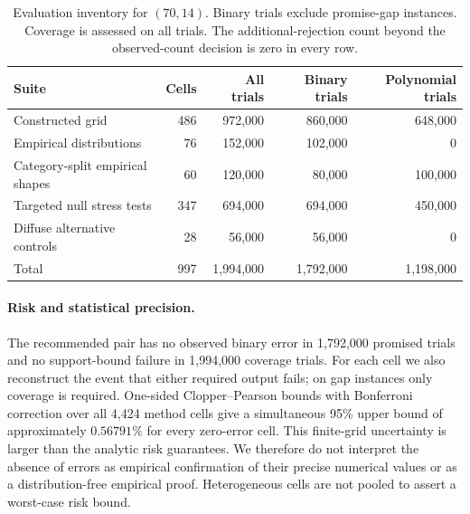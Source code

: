 \begin{table}[htbp]\centering\small
\caption{Evaluation inventory for $(70,14)$. Binary trials exclude promise-gap
instances. Coverage is assessed on all trials. The additional-rejection
count beyond the observed-count decision is zero in every row.}
\label{tab:finite-inventory}
\begin{tabular}{lrrrr}
\toprule
Suite & Cells & All trials & Binary trials & Polynomial trials\\\midrule
Constructed grid &486&972,000&860,000&648,000\\
Empirical distributions &76&152,000&102,000&0\\
Category-split empirical shapes &60&120,000&80,000&100,000\\
Targeted null stress tests &347&694,000&694,000&450,000\\
Diffuse alternative controls &28&56,000&56,000&0\\\midrule
Total &997&1,994,000&1,792,000&1,198,000\\\bottomrule
\end{tabular}
\end{table}

\paragraph{Risk and statistical precision.}
The recommended pair has no observed binary error in 1,792,000 promised
trials and no support-bound failure in 1,994,000 coverage trials.
For each cell we also reconstruct the event that either required output
fails; on gap instances only coverage is required. One-sided
Clopper--Pearson bounds with Bonferroni correction over all 4,424 method
cells give a simultaneous 95\% upper bound of approximately $0.56791\%$
for every zero-error cell. This finite-grid uncertainty is larger than the
analytic risk guarantees. We therefore do not interpret the absence of
errors as empirical confirmation of their precise numerical values or as
a distribution-free empirical proof. Heterogeneous cells are not pooled
to assert a worst-case risk bound.

